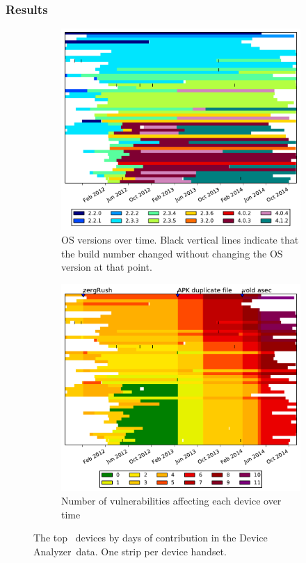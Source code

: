 \documentclass[conference,a4paper,twoside]{IEEEtran}
\newcommand{\da}{Device Analyzer}
\begin{document}
\subsubsection{Results}
\begin{figure}
 \centering
 \begin{subfigure}[b]{\columnwidth}
  \includegraphics[width=\columnwidth]{figures/device-data-all-os}
  \caption{OS versions over time. Black vertical lines indicate that the build number changed without changing the OS version at that point.}
  \label{fig:device_data_os}
 \end{subfigure}
 \begin{subfigure}[b]{\columnwidth}
  \includegraphics[width=\columnwidth]{figures/device-data-all-security}
  \caption{Number of vulnerabilities affecting each device over time}
  \label{fig:device_data_security}
 \end{subfigure}
 \caption{The top \daNumDeviceDataDevices\ devices by days of contribution in the \da\ data. One strip per device handset.}
\end{figure}
\end{document}
